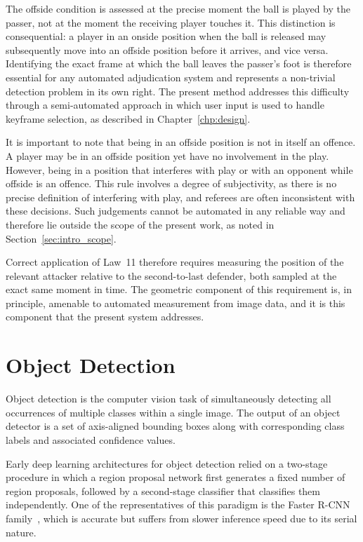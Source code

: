 The offside condition is assessed at the precise moment the ball is played by the passer, not at the moment the receiving player touches it. This distinction is consequential: a player in an onside position when the ball is released may subsequently move into an offside position before it arrives, and vice versa. Identifying the exact frame at which the ball leaves the passer's foot is therefore essential for any automated adjudication system and represents a non-trivial detection problem in its own right. The present method addresses this difficulty through a semi-automated approach in which user input is used to handle keyframe selection, as described in Chapter~\ref{chp:design}.

It is important to note that being in an offside position is not in itself an offence. A player may be in an offside position yet have no involvement in the play. However, being in a position that interferes with play or with an opponent while offside is an offence. This rule involves a degree of subjectivity, as there is no precise definition of interfering with play, and referees are often inconsistent with these decisions. Such judgements cannot be automated in any reliable way and therefore lie outside the scope of the present work, as noted in Section~\ref{sec:intro_scope}.

Correct application of Law~11 therefore requires measuring the position of the relevant attacker relative to the second-to-last defender, both sampled at the exact same moment in time. The geometric component of this requirement is, in principle, amenable to automated measurement from image data, and it is this component that the present system addresses.

\section{Object Detection}%
\label{sec:bg_detection}

Object detection is the computer vision task of simultaneously detecting all occurrences of multiple classes within a single image. The output of an object detector is a set of axis-aligned bounding boxes along with corresponding class labels and associated confidence values.

Early deep learning architectures for object detection relied on a two-stage procedure in which a region proposal network first generates a fixed number of region proposals, followed by a second-stage classifier that classifies them independently. One of the representatives of this paradigm is the Faster R-CNN family~\cite{ren2015faster}, which is accurate but suffers from slower inference speed due to its serial nature.

